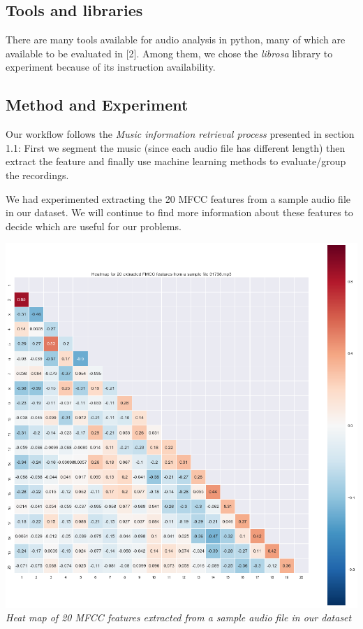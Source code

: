 \documentclass[paper=a4, fontsize=11pt]{scrartcl}
\begin{document}
\subsection{Tools and libraries}

There are many tools available for audio analysis in python, many of which are available to be evaluated in [2]. Among them, we chose the \textit{librosa} library to experiment because of its instruction availability. 


\subsection{Method and Experiment}

Our workflow follows the \textit{Music information retrieval process} presented in section 1.1: First we segment the music (since each audio file has different length) then extract the feature and finally use machine learning methods to evaluate/group the recordings.

We had experimented extracting the 20 MFCC features from a sample audio file in our dataset. We will continue to find more information about these features to decide which are useful for our problems.

\begin{center}
\includegraphics[scale=0.27]{img/2.png}\\
\textit{Heat map of 20 MFCC features extracted from a sample audio file in our dataset}\\
\end{center}
\end{document}
